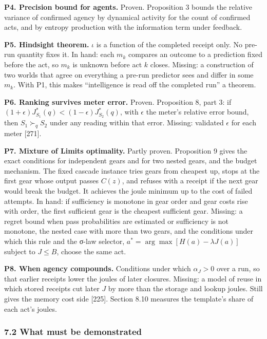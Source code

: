 \documentclass[
  10pt,
]{article}
\begin{document}
\textbf{P4. Precision bound for agents.} Proven. Proposition 3 bounds
the relative variance of confirmed agency by dynamical activity for the
count of confirmed acts, and by entropy production with the information
term under feedback.

\textbf{P5. Hindsight theorem.} \(\iota\) is a function of the completed
receipt only. No pre-run quantity fixes it. In hand: each \(m_k\)
compares an outcome to a prediction fixed before the act, so \(m_k\) is
unknown before act \(k\) closes. Missing: a construction of two worlds
that agree on everything a pre-run predictor sees and differ in some
\(m_k\). With P1, this makes ``intelligence is read off the completed
run'' a theorem.

\textbf{P6. Ranking survives meter error.} Proven. Proposition 8, part
3: if \((1+\epsilon)J^*_{S_1}(q) < (1-\epsilon)J^*_{S_2}(q)\), with
\(\epsilon\) the meter's relative error bound, then \(S_1 \succ_q S_2\)
under any reading within that error. Missing: validated \(\epsilon\) for
each meter {[}271{]}.

\textbf{P7. Mixture of Limits optimality.} Partly proven. Proposition 9
gives the exact conditions for independent gears and for two nested
gears, and the budget mechanism. The fixed cascade instance tries gears
from cheapest up, stops at the first gear whose output passes \(C(z)\),
and refuses with a receipt if the next gear would break the budget. It
achieves the joule minimum up to the cost of failed attempts. In hand:
if sufficiency is monotone in gear order and gear costs rise with order,
the first sufficient gear is the cheapest sufficient gear. Missing: a
regret bound when pass probabilities are estimated or sufficiency is not
monotone, the nested case with more than two gears, and the conditions
under which this rule and the σ-law selector,
\(a^* = \arg\max[H(a) - \lambda J(a)]\) subject to \(J \le B\), choose
the same act.

\textbf{P8. When agency compounds.} Conditions under which
\(\alpha_J > 0\) over a run, so that earlier receipts lower the joules
of later closures. Missing: a model of reuse in which stored receipts
cut later \(J\) by more than the storage and lookup joules. Still gives
the memory cost side {[}225{]}. Section 8.10 measures the template's
share of each act's joules.

\subsubsection{7.2 What must be
demonstrated}\label{what-must-be-demonstrated}
\end{document}
